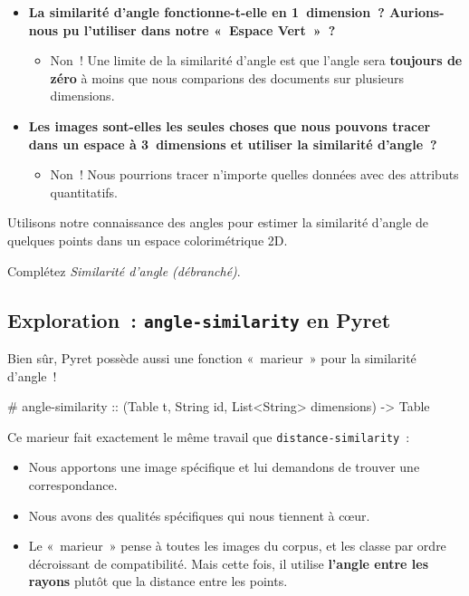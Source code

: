 \documentclass[12pt,a4paper]{article}
\newcommand{\contrat}[1]{%
  \begin{contractbox}
    \ttfamily #1
  \end{contractbox}
}
\begin{document}
\begin{thinkbox}
  \begin{itemize}
    \item \textbf{La similarité d'angle fonctionne-t-elle en 1~dimension~? Aurions-nous pu l'utiliser dans notre «~Espace Vert~»~?}
    \begin{itemize}
      \item Non~! Une limite de la similarité d'angle est que l'angle sera \textbf{toujours de zéro} à moins que nous comparions des documents sur plusieurs dimensions.
    \end{itemize}
    \item \textbf{Les images sont-elles les seules choses que nous pouvons tracer dans un espace à 3~dimensions et utiliser la similarité d'angle~?}
    \begin{itemize}
      \item Non~! Nous pourrions tracer n'importe quelles données avec des attributs quantitatifs.
    \end{itemize}
  \end{itemize}
\end{thinkbox}

\begin{activitybox}
  Utilisons notre connaissance des angles pour estimer la similarité d'angle de quelques points dans un espace colorimétrique 2D.

  Complétez \emph{Similarité d'angle (débranché)}.
\end{activitybox}

\subsection{Exploration~: \texttt{angle-similarity} en Pyret}

Bien sûr, Pyret possède aussi une fonction «~marieur~» pour la similarité d'angle~!

\contrat{\# angle-similarity :: (Table t, String id, List<String> dimensions) -> Table}

\begin{keypointbox}
  Ce marieur fait exactement le même travail que \texttt{distance-similarity}~:
  \begin{itemize}
    \item Nous apportons une image spécifique et lui demandons de trouver une correspondance.
    \item Nous avons des qualités spécifiques qui nous tiennent à cœur.
    \item Le «~marieur~» pense à toutes les images du corpus, et les classe par ordre décroissant de compatibilité. Mais cette fois, il utilise \textbf{l'angle entre les rayons} plutôt que la distance entre les points.
  \end{itemize}
\end{keypointbox}
\end{document}
